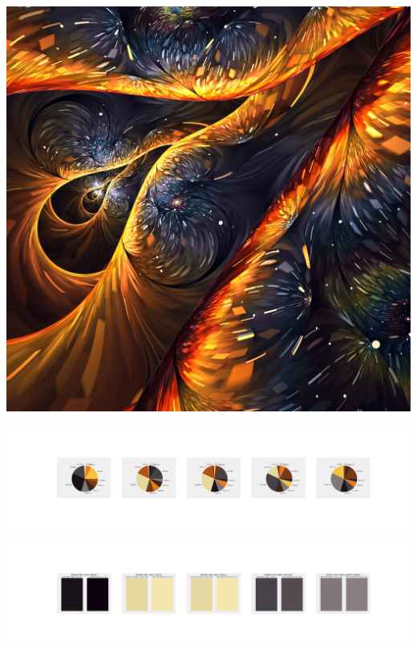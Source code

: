 \documentclass[11pt]{article}
\begin{document}
\begin{landscape}
    \begin{center}
    \includegraphics[width=\textwidth]{./nbimg/file (436).jpg}
    \end{center}

    \begin{center}
    \includegraphics[width=250mm]{./nbimg/pie-374.jpg}
    \end{center}

    \begin{center}
    \includegraphics[width=250mm]{./nbimg/peak-374.jpg}
    \end{center}
    


\end{landscape}
\end{document}

